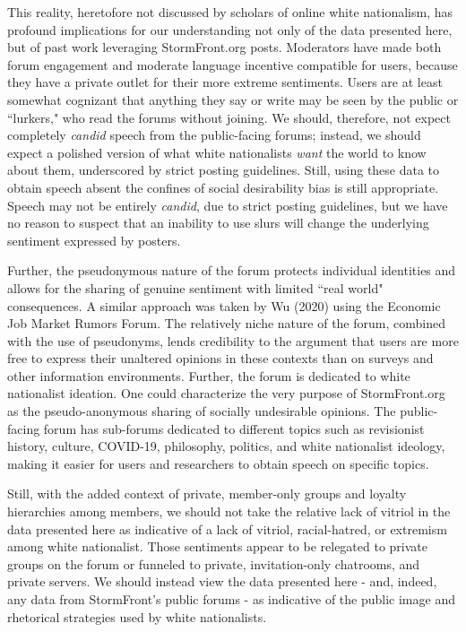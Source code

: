 \documentclass[12pt]{paper}
\begin{document}
This reality, heretofore not discussed by scholars of online white nationalism, has profound implications for our understanding not only of the data presented here, but of past work leveraging StormFront.org posts. Moderators have made both forum engagement and moderate language incentive compatible for users, because they have a private outlet for their more extreme sentiments. Users are at least somewhat cognizant that anything they say or write may be seen by the public or ``lurkers," who read the forums without joining. We should, therefore, not expect completely \textit{candid} speech from the public-facing forums; instead, we should expect a polished version of what white nationalists \textit{want} the world to know about them, underscored by strict posting guidelines. Still, using these data to obtain speech absent the confines of social desirability bias is still appropriate. Speech may not be entirely \textit{candid}, due to strict posting guidelines, but we have no reason to suspect that an inability to use slurs will change the underlying sentiment expressed by posters.

Further, the pseudonymous nature of the forum protects individual identities and allows for the sharing of genuine sentiment with limited ``real world" consequences. A similar approach was taken by Wu (2020) using the Economic Job Market Rumors Forum. The relatively niche nature of the forum, combined with the use of pseudonyms, lends credibility to the argument that users are more free to express their unaltered opinions in these contexts than on surveys and other information environments. Further, the forum is dedicated to white nationalist ideation. One could characterize the very purpose of StormFront.org as the pseudo-anonymous sharing of socially undesirable opinions. The public-facing forum has sub-forums dedicated to different topics such as revisionist history, culture, COVID-19, philosophy, politics, and white nationalist ideology, making it easier for users and researchers to obtain speech on specific topics.

Still, with the added context of private, member-only groups and loyalty hierarchies among members, we should not take the relative lack of vitriol in the data presented here as indicative of a lack of vitriol, racial-hatred, or extremism among white nationalist. Those sentiments appear to be relegated to private groups on the forum or funneled to private, invitation-only chatrooms, and private servers. We should instead view the data presented here - and, indeed, any data from StormFront's public forums - as indicative of the public image and rhetorical strategies used by white nationalists.
\end{document}

